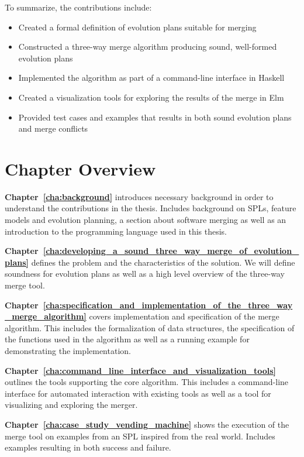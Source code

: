 \documentclass[a4paper,english]{ifimaster}
\begin{document}
To summarize, the contributions include:

\begin{itemize}
  \item Created a formal definition of evolution plans suitable for merging
  \item Constructed a three-way merge algorithm producing sound, well-formed evolution plans
  \item Implemented the algorithm as part of a command-line interface in Haskell
  \item Created a visualization tools for exploring the results of the merge in Elm
  \item Provided test cases and examples that results in both sound evolution plans and merge conflicts
\end{itemize}

\section{Chapter Overview}%
\label{sec:chapter_overview}

\textbf{Chapter~\ref{cha:background}} introduces necessary background in order to understand the contributions in the thesis. Includes background on SPLs, feature models and evolution planning, a section about software merging as well as an introduction to the programming language used in this thesis.

\textbf{Chapter~\ref{cha:developing_a_sound_three_way_merge_of_evolution_plans}} defines the problem and the characteristics of the solution. We will define soundness for evolution plans as well as a high level overview of the three-way merge tool.

\textbf{Chapter~\ref{cha:specification_and_implementation_of_the_three_way_merge_algorithm}} covers implementation and specification of the merge algorithm. This includes the formalization of data structures, the specification of the functions used in the algorithm as well as a running example for demonstrating the implementation.

\textbf{Chapter~\ref{cha:command_line_interface_and_visualization_tools}} outlines the tools supporting the core algorithm. This includes a command-line interface for automated interaction with existing tools as well as a tool for visualizing and exploring the merger.

\textbf{Chapter~\ref{cha:case_study_vending_machine}} shows the execution of the merge tool on examples from an SPL inspired from the real world. Includes examples resulting in both success and failure.
\end{document}
